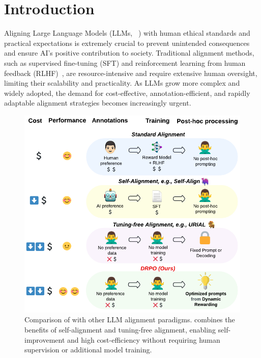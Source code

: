 \section{Introduction}


Aligning Large Language Models (LLMs, ~\citealt{brown2020language,chowdhery2023palm, touvron2023llama,achiam2023gpt}) with human ethical standards and practical expectations is extremely crucial to prevent unintended consequences and ensure AI's positive contribution to society. Traditional alignment methods, such as supervised fine-tuning (SFT) and reinforcement learning from human feedback (RLHF)~\cite{bai2022constitutional, ouyang2022training}, are resource-intensive and require extensive human oversight, limiting their scalability and practicality. As LLMs grow more complex and widely adopted, the demand for cost-effective, annotation-efficient, and rapidly adaptable alignment strategies becomes increasingly urgent.



\begin{figure}
    \centering
    \includegraphics[width=1\linewidth]{images/DRPO_comparison.pdf}
    \vspace{-18pt}
    \caption{Comparison of \ours with other LLM alignment paradigms. \ours combines the benefits of self-alignment and tuning-free alignment, enabling self-improvement and high cost-efficiency without requiring human supervision or additional model training.
    }
    \vspace{-22pt}
    \label{fig:paradigm_comparison}
\end{figure}



